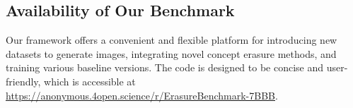 
\subsection{Availability of Our Benchmark}
Our framework offers a convenient and flexible platform for introducing new datasets to generate images, integrating novel concept erasure methods, and training various baseline versions.
The code is designed to be concise and user-friendly, which is accessible at \url{https://anonymous.4open.science/r/ErasureBenchmark-7BBB}.

